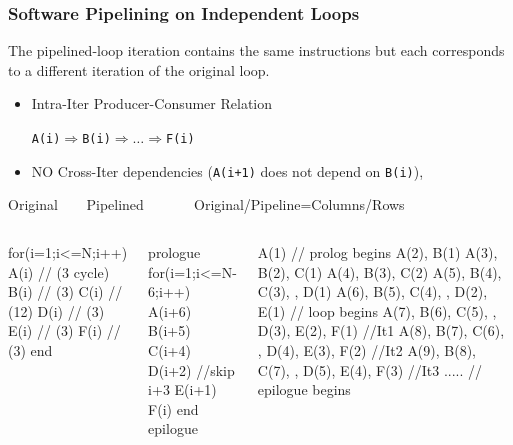 \documentclass{beamer}
\renewcommand{\emph}[1]{\textcolor{structure}{#1}}
\newcommand{\emp}[1]{\textcolor{DikuRed}{ #1}}
\begin{document}
\begin{frame}[fragile,t]
    \frametitle{Software Pipelining on Independent Loops}

The pipelined-loop iteration contains the same instructions 
but each corresponds to a different iteration of the original loop.

\begin{scriptsize}
\begin{itemize}
\item Intra-Iter Producer-Consumer Relation 
\begin{scriptsize}{\tt A(i)$\Rightarrow$B(i)$\Rightarrow\ldots \Rightarrow$F(i)}\end{scriptsize}
\item NO Cross-Iter dependencies ({\tt A(i+1)} does not depend on {\tt B(i)}),
\end{itemize}
\end{scriptsize}


\begin{block}{Original{\tt~~~~}Pipelined{\tt~~~~~~~}Original/Pipeline=Columns/Rows}\vspace{-2ex}
\begin{columns}
\begin{colorcode}[fontsize=\tiny]
for(i=1;i<=N;i++)
  A(i) // (3 cycle)
  B(i) // (3)
  C(i) // (12)
  D(i) // (3)
  E(i) // (3)
  F(i) // (3)
end
\end{colorcode}
\begin{colorcode}[fontsize=\tiny]
prologue
for(i=1;i<=N-6;i++)
  A(i+6)
  B(i+5)
  C(i+4)
  D(i+2) //\alert{skip i+3}
  E(i+1)
  F(i)
end
epilogue
\end{colorcode}
\pause
\begin{colorcode}[fontsize=\tiny]
\emp{A(1)}                                      // \emp{prolog begins}
\emp{A(2), B(1)} 
\emp{A(3), B(2), C(1)} 
\emp{A(4), B(3), C(2)} 
\emp{A(5), B(4), C(3),     , D(1)}
\emp{A(6), B(5), C(4),     , D(2), E(1)} // \emph{loop begins}
\emph{A(7), B(6), C(5),     , D(3), E(2), F(1)   //It1}
\emph{A(8), B(7), C(6),     , D(4), E(3), F(2)   //It2}
\emph{A(9), B(8), C(7),     , D(5), E(4), F(3)   //It3}
\emp{.....                                     // epilogue begins} 
\end{colorcode}
\end{columns}
\end{block}
\smallskip



\end{frame}
\end{document}
